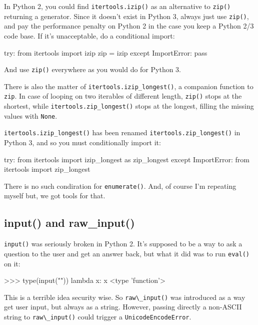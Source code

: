 In Python 2, you could find \lstinline{itertools.izip()} as an alternative to \lstinline{zip()} returning a generator. Since it doesn't exist in Python 3, always just use \lstinline{zip()}, and pay the performance penalty on Python 2 in the case you keep a Python 2/3 code base. If it's unacceptable, do a conditional import:

\begin{py2and3}
try:
    from itertools import izip
    zip = izip
except ImportError:
    pass
\end{py2and3}

And use \lstinline{zip()} everywhere as you would do for Python 3.

There is also the matter of \lstinline{itertools.izip_longest()}, a companion function to \lstinline{zip}. In case of looping on two iterables of different length, \lstinline{zip()} stops at the shortest, while \lstinline{itertools.zip_longest()} stops at the longest, filling the missing values with \lstinline{None}.

\lstinline{itertools.izip_longest()} has been renamed \lstinline{itertools.zip_longest()} in Python 3, and so you must conditionally import it:

\begin{py2and3}
try:
    from itertools import izip_longest as zip_longest
except ImportError:
    from itertools import zip_longest
\end{py2and3}

There is no such condiration for \lstinline{enumerate()}. And, of course I'm repeating myself but, we got tools for that.

\subsection{input() and raw\_input()}

\lstinline{input()} was seriously broken in Python 2. It's supposed to be a way to ask a question to the user and get an answer back, but what it did was to run \lstinline{eval()} on it:

\begin{py2}
>>> type(input(""))
lambda x: x
<type 'function'>
\end{py2}

This is a terrible idea security wise. So \lstinline{raw\_input()} was introduced as a way get user input, but always as a string. However, passing directly a non-ASCII string to \lstinline{raw\_input()} could trigger a \lstinline{UnicodeEncodeError}.


